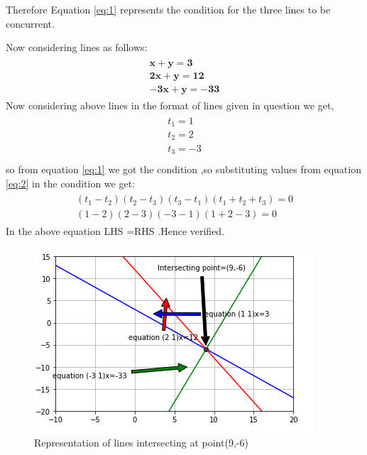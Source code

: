 \documentclass[journal,12pt,twocolumn]{IEEEtran}
\begin{document}
Therefore Equation \eqref{eq:1} represents the condition for the three lines to be concurrent.

Now considering lines as follows:
\begin{align}
\begin{split}
\mathbf{x + y = 3}\\
\mathbf{2x +y =12}\\
\mathbf{-3x+y =-33}
\end{split}
\end{align}
Now considering above lines in the format of lines given in question we get,
\begin{align}
\begin{split}
t_1=1\\
t_2=2\\
t_3=-3\\
\end{split}
\label{eq:2}
\end{align}
so from equation \eqref{eq:1} we got the condition ,so substituting values from equation \eqref{eq:2} in the condition we get:
\begin{align}
\begin{split}
(t_1-t_2)(t_2-t_3)(t_3-t_1)(t_1+t_2+t_3)=0\\
(1-2)(2-3)(-3-1)(1+2-3)=0
\end{split}
\end{align}
In the above equation LHS =RHS .Hence verified.

\begin{figure}[!ht]
    \centering
    \includegraphics[width=\columnwidth]{assignment-2.PNG}
    \caption{Representation of lines intersecting at point(9,-6)}
    \label{fig:}
\end{figure}
\end{document}
